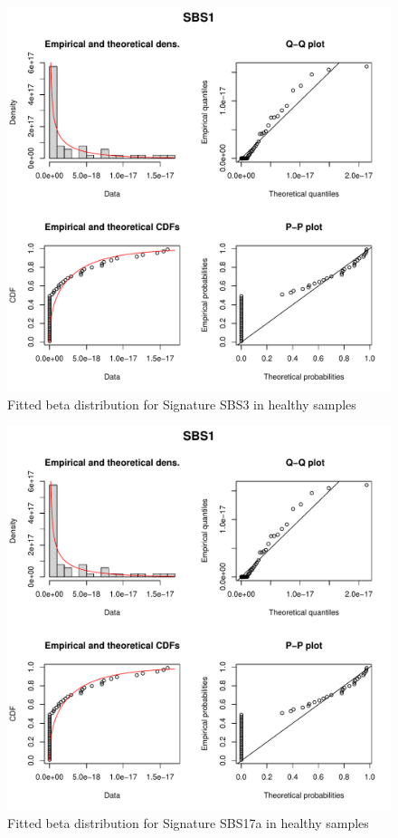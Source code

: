 \begin{figure}[ht]
\centering
\includegraphics[width=.99\linewidth, page=3]{Figures/MisMatchFinder/signatureFittedDists.pdf}
\caption[Fitted beta distribution for Signature SBS3 in healthy samples]{Fitted beta distribution for Signature SBS3 in healthy samples}\label{A:fig:fittedDistsSBS3}
\end{figure}

\begin{figure}[ht]
\centering
\includegraphics[width=.99\linewidth, page=21]{Figures/MisMatchFinder/signatureFittedDists.pdf}
\caption[Fitted beta distribution for Signature SBS17a in healthy samples]{Fitted beta distribution for Signature SBS17a in healthy samples}\label{A:fig:fittedDistsSBS17a}
\end{figure}

